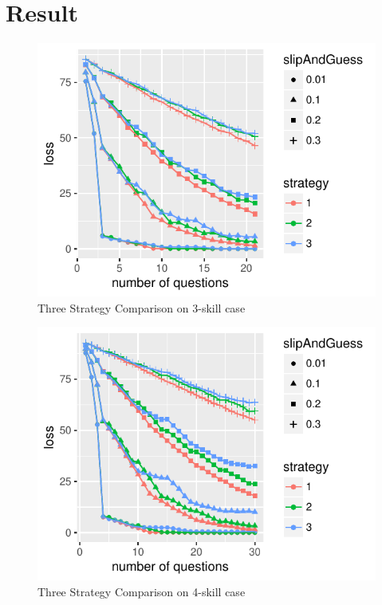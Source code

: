 \documentclass{edm_template}
\begin{document}
\section{Result}
\begin{figure}[h!]
  \begin{center}
  \includegraphics[width=\columnwidth]{simResults/LossStrategyComparisonThreeSkills.pdf}
  \end{center}
  \caption{Three Strategy Comparison on 3-skill case}  
  \label{fig:ComparisonThreeSkill}
\end{figure}

\begin{figure}[h!]
  \begin{center}
  \includegraphics[width=\columnwidth]{simResults/LossStrategyComparisonFourSkills.pdf}
  \end{center}
  \caption{Three Strategy Comparison on 4-skill case}  
  \label{fig:ComparisonFourSkill}
\end{figure}
\end{document}
